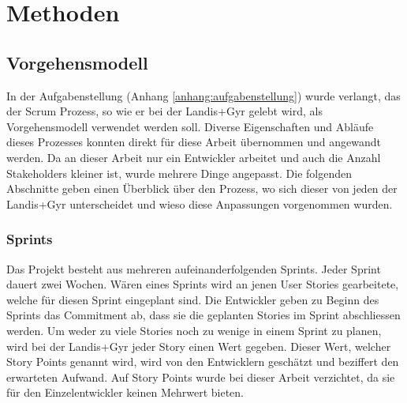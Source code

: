 \chapter{Methoden}






\section{Vorgehensmodell}\label{vorgehen}
In der Aufgabenstellung (Anhang \ref{anhang:aufgabenstellung}) wurde verlangt, das der Scrum Prozess, so wie er bei der Landis+Gyr gelebt wird, als Vorgehensmodell verwendet werden soll.
Diverse Eigenschaften und Abläufe dieses Prozesses konnten direkt für diese Arbeit übernommen und angewandt werden.
Da an dieser Arbeit nur ein Entwickler arbeitet und auch die Anzahl Stakeholders kleiner ist, wurde mehrere Dinge angepasst.
Die folgenden Abschnitte geben einen Überblick über den Prozess, wo sich dieser von jeden der Landis+Gyr unterscheidet und wieso diese Anpassungen vorgenommen wurden.

\subsection{Sprints}
Das Projekt besteht aus mehreren aufeinanderfolgenden Sprints.
Jeder Sprint dauert zwei Wochen.
Wären eines Sprints wird an jenen User Stories gearbeitete, welche für diesen Sprint eingeplant sind.
Die Entwickler geben zu Beginn des Sprints das Commitment ab, dass sie die geplanten Stories im Sprint abschliessen werden.
Um weder zu viele Stories noch zu wenige in einem Sprint zu planen, wird bei der Landis+Gyr jeder Story einen Wert gegeben.
Dieser Wert, welcher Story Points genannt wird, wird von den Entwicklern geschätzt und beziffert den erwarteten Aufwand.
Auf Story Points wurde bei dieser Arbeit verzichtet, da sie für den Einzelentwickler keinen Mehrwert bieten.

